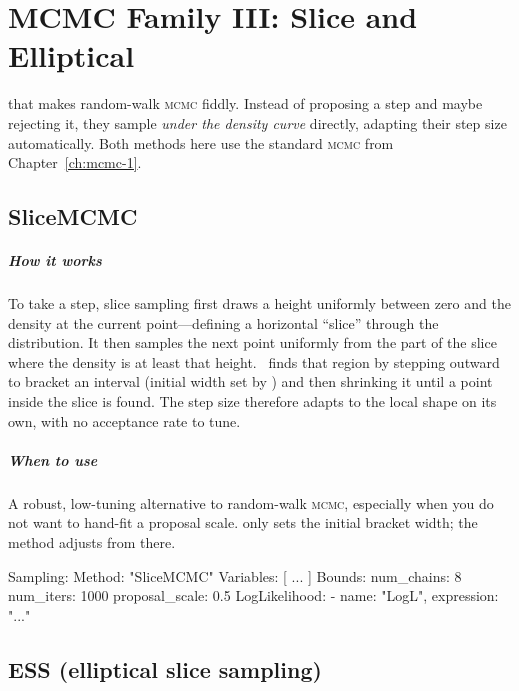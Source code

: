 \chapter{MCMC Family III: Slice and Elliptical}
\label{ch:mcmc-3}

 that makes random-walk \textsc{mcmc}
fiddly. Instead of proposing a step and maybe rejecting it, they sample \emph{under the density
curve} directly, adapting their step size automatically. Both methods here use the standard
\textsc{mcmc}  from Chapter~\ref{ch:mcmc-1}.

\section{SliceMCMC}
\label{sec:s-slicemcmc}

\paragraph{How it works} To take a step, slice sampling first draws a height uniformly between zero
and the density at the current point---defining a horizontal ``slice'' through the distribution. It
then samples the next point uniformly from the part of the slice where the density is at least that
height. \Jarvis\ finds that region by stepping outward to bracket an interval (initial width set by
) and then shrinking it until a point inside the slice is found. The step
size therefore adapts to the local shape on its own, with no acceptance rate to tune.

\paragraph{When to use} A robust, low-tuning alternative to random-walk \textsc{mcmc}, especially
when you do not want to hand-fit a proposal scale.  only sets the initial
bracket width; the method adjusts from there.

\begin{yamlwin}
Sampling:
  Method: "SliceMCMC"
  Variables: [ ... ]
  Bounds:
    num_chains: 8
    num_iters: 1000
    proposal_scale: 0.5
  LogLikelihood:
    - {name: "LogL", expression: "..."}
\end{yamlwin}

\section{ESS (elliptical slice sampling)}
\label{sec:s-ess}

